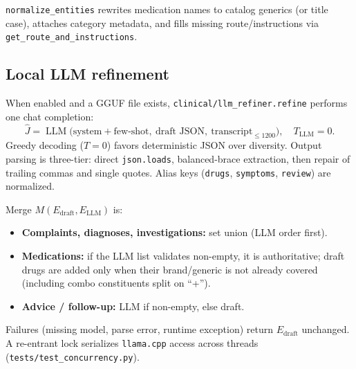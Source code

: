 \documentclass[11pt,a4paper]{article}
\begin{document}
\texttt{normalize\_entities} rewrites medication names to catalog generics (or title case), attaches category metadata, and fills missing route/instructions via \texttt{get\_route\_and\_instructions}.

\subsection{Local LLM refinement}
When enabled and a GGUF file exists, \texttt{clinical/llm\_refiner.refine} performs one chat completion:
\begin{equation}
  \hat{J} = \operatorname{LLM}\bigl(\text{system}+\text{few-shot},\ \text{draft JSON},\ \text{transcript}_{\le 1200}\bigr),\quad T_{\text{LLM}}=0.
\end{equation}
Greedy decoding ($T=0$) favors deterministic JSON over diversity. Output parsing is three-tier: direct \texttt{json.loads}, balanced-brace extraction, then repair of trailing commas and single quotes. Alias keys (\texttt{drugs}, \texttt{symptoms}, \texttt{review}) are normalized.

Merge $M(E_{\text{draft}}, E_{\text{LLM}})$ is:
\begin{itemize}[leftmargin=1.4em]
  \item \textbf{Complaints, diagnoses, investigations:} set union (LLM order first).
  \item \textbf{Medications:} if the LLM list validates non-empty, it is authoritative; draft drugs are added only when their brand/generic is not already covered (including combo constituents split on ``+'').
  \item \textbf{Advice / follow-up:} LLM if non-empty, else draft.
\end{itemize}
Failures (missing model, parse error, runtime exception) return $E_{\text{draft}}$ unchanged. A re-entrant lock serializes \texttt{llama.cpp} access across threads (\texttt{tests/test\_concurrency.py}).
\end{document}

